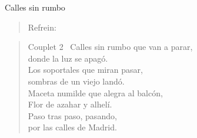 \begin{song}{Calles sin rumbo}
\begin{verse}{Refrein:}
		\end{verse}
		\begin{verse}{Couplet 2}
			\ Calles sin rumbo que van a parar,\\
			donde la luz se apagó.\\
			Los soportales que miran pasar,\\
			sombras de un viejo landó.\\	
			Maceta numilde que alegra al balcón,\\
			Flor de azahar y alhelí.\\
			Paso tras paso, pasando,\\
			por las calles de Madrid.\\
		\end{verse}
	\end{song}
